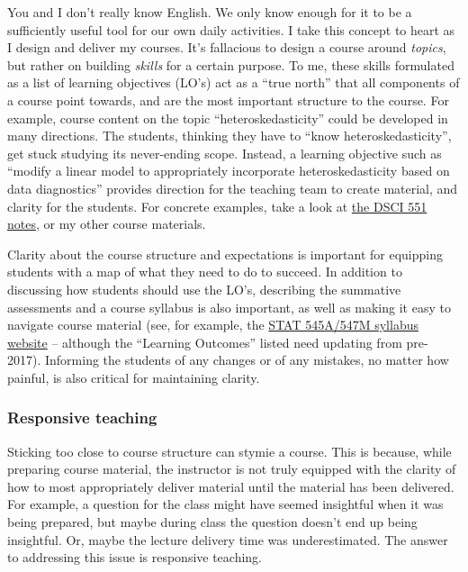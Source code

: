 \documentclass[]{article}
\begin{document}
You and I don't really know English. We only know enough for it to be a sufficiently useful tool for our own daily activities. I take this concept to heart as I design and deliver my courses. It's fallacious to design a course around \emph{topics}, but rather on building \emph{skills} for a certain purpose. To me, these skills formulated as a list of learning objectives (LO's) act as a ``true north'' that all components of a course point towards, and are the most important structure to the course. For example, course content on the topic ``heteroskedasticity'' could be developed in many directions. The students, thinking they have to ``know heteroskedasticity'', get stuck studying its never-ending scope. Instead, a learning objective such as ``modify a linear model to appropriately incorporate heteroskedasticity based on data diagnostics'' provides direction for the teaching team to create material, and clarity for the students. For concrete examples, take a look at \href{https://ubc-mds.github.io/DSCI_551_stat-prob-dsci/lectures/}{the DSCI 551 notes}, or my other course materials.

Clarity about the course structure and expectations is important for equipping students with a map of what they need to do to succeed. In addition to discussing how students should use the LO's, describing the summative assessments and a course syllabus is also important, as well as making it easy to navigate course material (see, for example, the \href{https://stat545.stat.ubc.ca/}{STAT 545A/547M syllabus website} -- although the ``Learning Outcomes'' listed need updating from pre-2017). Informing the students of any changes or of any mistakes, no matter how painful, is also critical for maintaining clarity.

\hypertarget{responsive-teaching}{%
\subsubsection{Responsive teaching}\label{responsive-teaching}}

Sticking too close to course structure can stymie a course. This is because, while preparing course material, the instructor is not truly equipped with the clarity of how to most appropriately deliver material until the material has been delivered. For example, a question for the class might have seemed insightful when it was being prepared, but maybe during class the question doesn't end up being insightful. Or, maybe the lecture delivery time was underestimated. The answer to addressing this issue is responsive teaching.
\end{document}
